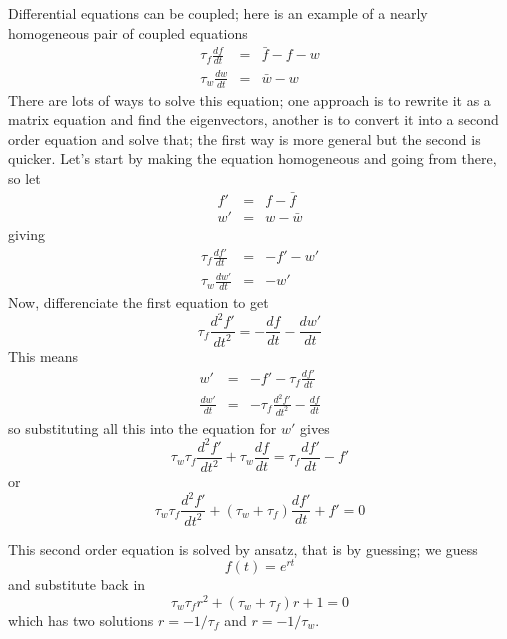 \documentclass{article}
\begin{document}
Differential equations can be coupled; here is an example of a nearly homogeneous pair of coupled equations
\begin{eqnarray}
\tau_f \frac{df}{dt}&=&\bar{f}-f-w\\
\tau_w \frac{dw}{dt}&=&\bar{w}-w
\end{eqnarray}
There are lots of ways to solve this equation; one approach is to rewrite it as a matrix equation and find the eigenvectors, another is to convert it into a second  order equation and solve that; the first way is more general but the second is quicker. Let's start by making the equation homogeneous and going from there, so
let
\begin{eqnarray}
f'&=&f-\bar{f}\\
w'&=&w-\bar{w}
\end{eqnarray}
giving
\begin{eqnarray}
\tau_f \frac{df'}{dt}&=&-f'-w'\\
\tau_w \frac{dw'}{dt}&=&-w'
\end{eqnarray}
Now, differenciate the first equation to get
\begin{equation}
\tau_f \frac{d^2f'}{dt^2}=-\frac{df}{dt}-\frac{dw'}{dt}
\end{equation}
This means
\begin{eqnarray}
w'&=&-f'-\tau_f \frac{df'}{dt}\\
\frac{dw'}{dt}&=&-\tau_f \frac{d^2f'}{dt^2}-\frac{df}{dt}
\end{eqnarray}
so substituting all this into the equation for $w'$ gives
\begin{equation}
\tau_w\tau_f \frac{d^2f'}{dt^2}+\tau_w\frac{df}{dt}=\tau_f\frac{df'}{dt}-f'
\end{equation}
or
\begin{equation}
\tau_w\tau_f \frac{d^2f'}{dt^2}+(\tau_w+\tau_f)\frac{df'}{dt}+f'=0
\end{equation}

This second order equation is solved by ansatz, that is by guessing; we guess
\begin{equation}
f(t)=e^{rt}
\end{equation}
and substitute back in
\begin{equation}
\tau_w\tau_f r^2+(\tau_w+\tau_f)r+1=0
\end{equation}
which has two solutions $r=-1/\tau_f$ and $r=-1/\tau_w$.
\end{document}
